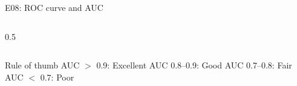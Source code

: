 \documentclass[aspectratio=169, 10pt]{beamer}
\begin{document}
\begin{frame}{E08: ROC curve and AUC}
\begin{columns}
\begin{column}{0.5\textwidth}
\begin{center}
            \end{center}
        \end{column}
    \end{columns}
    
    \vspace{3mm}
    
    \begin{block}{Rule of thumb}
        AUC $>$ 0.9: Excellent \quad AUC 0.8--0.9: Good \quad AUC 0.7--0.8: Fair \quad AUC $<$ 0.7: Poor
    \end{block}
    
\end{frame}
\end{document}

